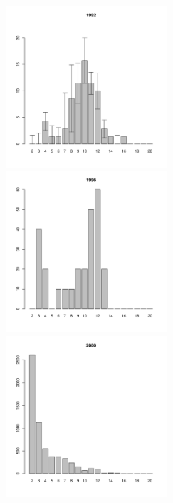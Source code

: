 	\begin{figure}[hp]

	\begin{minipage}[b]{.3\linewidth}
	\begin{center}
	\includegraphics[width=60mm]{../White_Sea/Luvenga_Goreliy/high2_1992_.pdf}	
	\end{center}
	\end{minipage}
	\hfil %
	\begin{minipage}[b]{.3\linewidth}
	\begin{center}
	\includegraphics[width=60mm]{../White_Sea/Luvenga_Goreliy/high2_1996_.pdf}
	\end{center}
	\end{minipage}
	\hfil %
	\begin{minipage}[b]{.3\linewidth}
	\begin{center}
\includegraphics[width=60mm]{../White_Sea/Luvenga_Goreliy/high2_2000_.pdf}

\end{center}
\end{minipage}
\end{figure}
